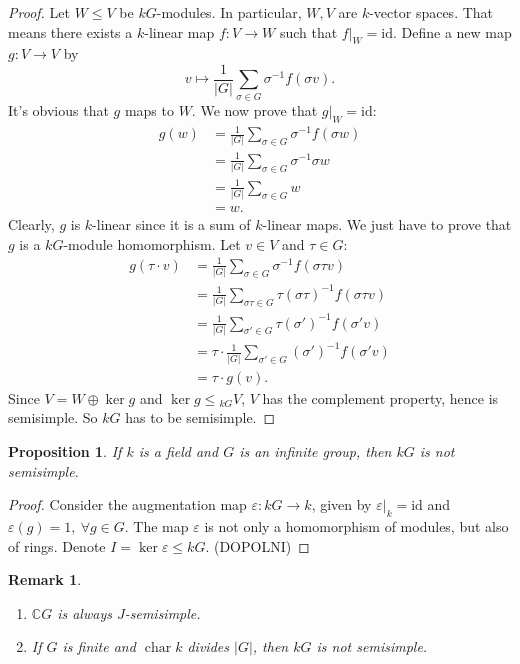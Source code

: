 \documentclass[10pt, a4paper]{article}
\newtheorem{proposition}[thm]{Proposition}
\newtheorem*{remark}{Remark}
\newenvironment{noticeC}{%
  \tcolorbox[%
  notitle,
  empty,
  enhanced,  %
  breakable,
  coltext=black, 
  fontupper=\rmfamily,
  noparskip,
  sharp corners,
  boxrule=-1pt,  %
  frame hidden,
  left=7pt,  %
  right=7pt,
  top=5pt,
  bottom=5pt,
  before skip=2.5ex plus 2pt,
  after skip=2.5ex plus 2pt,
  overlay unbroken and last={%
  },
  ]}
{\endtcolorbox}
\newenvironment{myproof}%
  {\begin{noticeC}\begin{proof}}%
  {\end{proof}\end{noticeC}}
\newcommand{\C}{\mathbb {C}}
\DeclareMathOperator{\chara}{char}
\begin{document}
\begin{myproof}
  Let $W \leq V$ be $kG$-modules. In particular, $W, V$ are $k$-vector spaces.
  That means there exists a $k$-linear map $f: V \to W$ such that $f\big|_W = \mathrm{id}$.
  Define a new map $g: V \to V$ by 
  $$v \mapsto \frac{1}{|G|} \sum_{\sigma \in G} \sigma^{-1} f(\sigma v).$$
  It's obvious that $g$ maps to $W$. We now prove that $g\big|_W = \mathrm{id}$:
  \begin{align*}
    g(w) &= \frac{1}{|G|} \sum_{\sigma \in G} \sigma^{-1} f(\sigma w)\\
    &= \frac{1}{|G|} \sum_{\sigma \in G} \sigma^{-1} \sigma w\\
    &= \frac{1}{|G|} \sum_{\sigma \in G} w\\
    &= w.
  \end{align*}
  Clearly, $g$ is $k$-linear since it is a sum of $k$-linear maps.
  We just have to prove that $g$ is a $kG$-module homomorphism.
  Let $v \in V$ and $\tau \in G$:
  \begin{align*}
    g(\tau \cdot v) &= \frac{1}{|G|} \sum_{\sigma \in G} \sigma^{-1} f(\sigma \tau v)\\
    &= \frac{1}{|G|} \sum_{\sigma \tau \in G} \tau (\sigma \tau)^{-1} f(\sigma \tau v)\\
    &= \frac{1}{|G|} \sum_{\sigma' \in G} \tau (\sigma')^{-1} f(\sigma' v)\\
    &= \tau \cdot \frac{1}{|G|} \sum_{\sigma' \in G} (\sigma')^{-1} f(\sigma' v)\\
    &= \tau \cdot g(v).
  \end{align*}
  Since $V = W \oplus \ker g$ and $\ker g \leq {}_{kG} V$, $V$ has the complement property, hence is semisimple.
  So $kG$ has to be semisimple.
\end{myproof}

\begin{proposition}
  If $k$ is a field and $G$ is an infinite group, then $kG$ is not semisimple.
\end{proposition}

\begin{myproof}
  Consider the augmentation map $\varepsilon: kG \to k$, given by $\varepsilon\big|_k = \mathrm{id}$ and 
  $\varepsilon (g) = 1,\ \forall g \in G$. The map $\varepsilon$ is not only a homomorphism of modules, but also of rings.
  Denote $I = \ker \varepsilon \leq kG$. (DOPOLNI)
\end{myproof}

\begin{remark}
  \begin{enumerate}
    \item $\C G$ is always $J$-semisimple.
    \item If $G$ is finite and $\chara k$ divides $|G|$, then $kG$ is not semisimple.
  \end{enumerate}
\end{remark}
\end{document}

